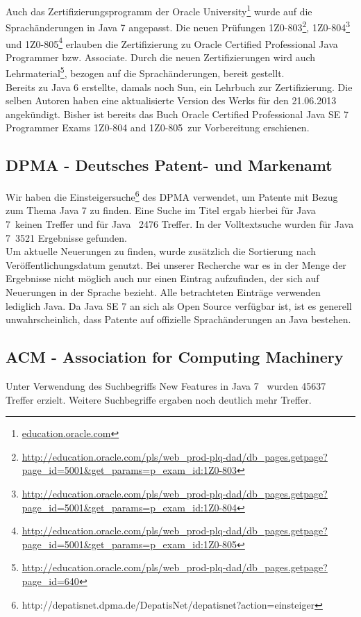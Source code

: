 Auch das Zertifizierungsprogramm der Oracle University\footnote{\url{education.oracle.com}} wurde auf die Sprachänderungen in Java 7 angepasst.
Die neuen Prüfungen 1Z0-803\footnote{\url{http://education.oracle.com/pls/web_prod-plq-dad/db_pages.getpage?page_id=5001&get_params=p_exam_id:1Z0-803}}, 
1Z0-804\footnote{\url{http://education.oracle.com/pls/web_prod-plq-dad/db_pages.getpage?page_id=5001&get_params=p_exam_id:1Z0-804}} und 
1Z0-805\footnote{\url{http://education.oracle.com/pls/web_prod-plq-dad/db_pages.getpage?page_id=5001&get_params=p_exam_id:1Z0-805}} 
erlauben die Zertifizierung zu Oracle Certified Professional Java Programmer bzw. Associate.
Durch die neuen Zertifizierungen wird auch Lehrmaterial\footnote{\url{http://education.oracle.com/pls/web_prod-plq-dad/db_pages.getpage?page_id=640}}, 
bezogen auf die Sprachänderungen, bereit gestellt.\\

Bereits zu Java 6 erstellte, damals noch Sun, ein Lehrbuch\cite{scjp6} zur Zertifizierung. Die selben Autoren haben eine aktualisierte 
Version des Werks\cite{scjp7} für den 21.06.2013 angekündigt. Bisher ist bereits das Buch 
\glqq Oracle Certified Professional Java SE 7 Programmer Exams 1Z0-804 and 1Z0-805\grqq\cite{apressjava}~zur Vorbereitung erschienen.

\subsection{DPMA - Deutsches Patent- und Markenamt}

Wir haben die Einsteigersuche\footnote{http://depatisnet.dpma.de/DepatisNet/depatisnet?action=einsteiger} des DPMA verwendet, um Patente mit Bezug zum Thema Java 7 zu finden. Eine Suche im Titel ergab hierbei für \glqq Java 7\grqq ~keinen Treffer und für \glqq Java \grqq ~2476 Treffer. In der Volltextsuche wurden für \glqq Java 7\grqq ~3521 Ergebnisse gefunden.\\

Um aktuelle Neuerungen zu finden, wurde zusätzlich die Sortierung nach Veröffentlichungsdatum genutzt. Bei unserer Recherche war es in der Menge der Ergebnisse nicht möglich auch nur einen Eintrag aufzufinden, der sich auf Neuerungen in der Sprache bezieht. Alle betrachteten Einträge verwenden lediglich Java. Da Java SE 7 an sich als Open Source verfügbar ist, ist es generell unwahrscheinlich, dass Patente auf offizielle Sprachänderungen an Java bestehen.\\

\subsection{ACM - Association for Computing Machinery}
Unter Verwendung des Suchbegriffs \glqq New Features in Java 7 \grqq ~wurden 45637 Treffer erzielt.
Weitere Suchbegriffe ergaben noch deutlich mehr Treffer.\\

